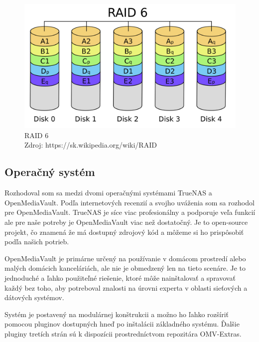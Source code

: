 \documentclass[12pt,oneside,slovak,a4paper]{article}
\begin{document}
\begin{figure}[H]
	\centering
	\captionsetup{justification=centering,margin=2cm}
	\includegraphics[width=\linewidth]{./images/RAID_6.png} %
	\centering
	\caption{RAID 6 \\ Zdroj: https://sk.wikipedia.org/wiki/RAID}
\end{figure}

\subsection{Operačný systém}
Rozhodoval som sa medzi dvomi operačnými systémami TrueNAS a OpenMediaVault. Podľa internetových recenzií a svojho uváženia som sa rozhodol pre OpenMediaVault. TrueNAS je síce viac profesionálny a podporuje veľa funkcií ale pre naše potreby je OpenMediaVault viac než dostatočný. Je to open-source projekt, čo znamená že má dostupný zdrojový kód a môžeme si ho prispôsobiť podľa našich potrieb.

OpenMediaVault je primárne určený na používanie v domácom prostredí alebo malých domácich kanceláriách, ale nie je obmedzený len na tieto scenáre. Je to jednoduché a ľahko použiteľné riešenie, ktoré môže nainštalovať a spravovať každý bez toho, aby potreboval znalosti na úrovni experta v oblasti sieťových a dátových systémov.

Systém je postavený na modulárnej konštrukcii a možno ho ľahko rozšíriť pomocou pluginov dostupných hneď po inštalácii základného systému. Ďalšie pluginy tretích strán sú k dispozícii prostredníctvom repozitára OMV-Extras.
\end{document}
